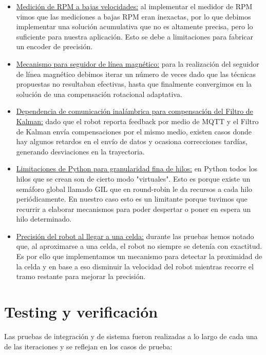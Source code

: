 \begin{itemize}
    \item \underline{Medición de RPM a bajas velocidades:} al implementar el medidor de RPM vimos que las mediciones a bajas RPM eran inexactas, por lo que debimos implementar una solución acumulativa que no es altamente precisa, pero lo suficiente para nuestra aplicación. Esto se debe a limitaciones para fabricar un encoder de precisión.

    \item \underline{Mecanismo para seguidor de línea magnético:} para la realización del seguidor de línea magnético debimos iterar un número de veces dado que las técnicas propuestas no resultaban efectivas, hasta que finalmente convergimos en la solución de una compensación rotacional adaptativa.

    \item \underline{Dependencia de comunicación inalámbrica para compensación del Filtro de Kalman:} dado que el robot reporta feedback por medio de MQTT y el Filtro de Kalman envía compensaciones por el mismo medio, existen casos donde hay algunos retardos en el envío de datos y ocasiona correcciones tardías, generando desviaciones en la trayectoria.

    \item \underline{Limitaciones de Python para granularidad fina de hilos:} en Python todos los hilos que se crean son de cierto modo "virtuales". Esto es porque existe un semáforo global llamado GIL que en round-robin le da recursos a cada hilo periódicamente. En nuestro caso esto es un limitante porque tuvimos que recurrir a elaborar mecanismos para poder despertar o poner en espera un hilo determinado.

    \item \underline{Precisión del robot al llegar a una celda:} durante las pruebas hemos notado que, al aproximarse a una celda, el robot no siempre se detenía con exactitud. Es por ello que implementamos un mecanismo para detectar la proximidad de la celda y en base a eso disminuir la velocidad del robot mientras recorre el tramo restante para mejorar la precisión.
\end{itemize}


\section{Testing y verificación}

Las pruebas de integración y de sistema fueron realizadas a lo largo de cada una de las iteraciones y se reflejan en los casos de prueba:

